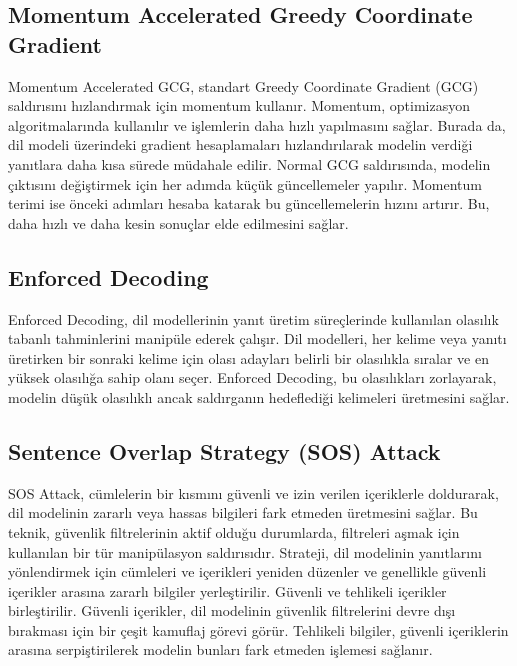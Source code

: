 \newpage

\subsection{Momentum Accelerated Greedy Coordinate Gradient}

Momentum Accelerated GCG, standart Greedy Coordinate Gradient (GCG) saldırısını hızlandırmak için momentum kullanır. Momentum, optimizasyon algoritmalarında kullanılır ve işlemlerin daha hızlı yapılmasını sağlar. Burada da, dil modeli üzerindeki gradient hesaplamaları hızlandırılarak modelin verdiği yanıtlara daha kısa sürede müdahale edilir. Normal GCG saldırısında, modelin çıktısını değiştirmek için her adımda küçük güncellemeler yapılır. Momentum terimi ise önceki adımları hesaba katarak bu güncellemelerin hızını artırır. Bu, daha hızlı ve daha kesin sonuçlar elde edilmesini sağlar.

\newpage

\subsection{Enforced Decoding}

Enforced Decoding, dil modellerinin yanıt üretim süreçlerinde kullanılan olasılık tabanlı tahminlerini manipüle ederek çalışır. Dil modelleri, her kelime veya yanıtı üretirken bir sonraki kelime için olası adayları belirli bir olasılıkla sıralar ve en yüksek olasılığa sahip olanı seçer. Enforced Decoding, bu olasılıkları zorlayarak, modelin düşük olasılıklı ancak saldırganın hedeflediği kelimeleri üretmesini sağlar.

\newpage

\subsection{Sentence Overlap Strategy (SOS) Attack}

SOS Attack, cümlelerin bir kısmını güvenli ve izin verilen içeriklerle doldurarak, dil modelinin zararlı veya hassas bilgileri fark etmeden üretmesini sağlar. Bu teknik, güvenlik filtrelerinin aktif olduğu durumlarda, filtreleri aşmak için kullanılan bir tür manipülasyon saldırısıdır. Strateji, dil modelinin yanıtlarını yönlendirmek için cümleleri ve içerikleri yeniden düzenler ve genellikle güvenli içerikler arasına zararlı bilgiler yerleştirilir. Güvenli ve tehlikeli içerikler birleştirilir. Güvenli içerikler, dil modelinin güvenlik filtrelerini devre dışı bırakması için bir çeşit kamuflaj görevi görür. Tehlikeli bilgiler, güvenli içeriklerin arasına serpiştirilerek modelin bunları fark etmeden işlemesi sağlanır.

